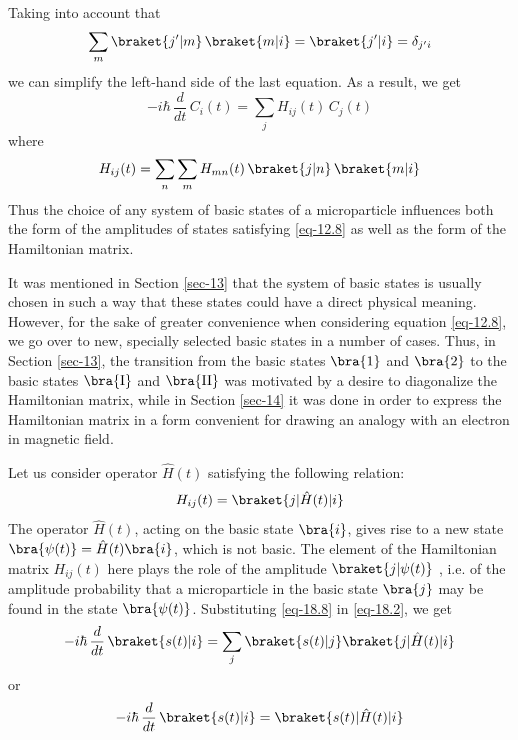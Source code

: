 \documentclass[a4paper,sfsidenotes,colorlinks=true]{tufte-book}
\numberwithin{equation}{section}
\numberwithin{figure}{section}
\begin{document}
Taking into account that 
\begin{equation*}%
\sum_{m} \braket{j'|m} \, \braket{m|i} = \braket{j'|i} = \delta_{j' i} 
\end{equation*}
we can simplify the left-hand side of the last equation. As a result, we get 
\begin{equation*}%
- i \hbar \, \frac{d}{dt} \, C_{i}(t)  = \sum_{j}  H_{ij} (t) \, C_{j}(t)
\end{equation*}
where
\begin{equation}%
H_{ij}(t) = \sum_{n} \sum_{m} H_{mn} (t) \, \braket{j|n} \, \braket{m|i}
\label{eq-18.7}
\end{equation}
Thus the choice of any system of basic states of a microparticle
influences both the form of the amplitudes of states satisfying \ref{eq-12.8}
as well as the form of the Hamiltonian matrix.

It was mentioned in Section \ref{sec-13} that the system of basic
states is usually chosen in such a way that these states could have a
direct physical meaning. However, for the sake of greater convenience
when considering equation \ref{eq-12.8}, we go over to new, specially
selected basic states in a number of cases. Thus, in Section
\ref{sec-13}, the transition from the basic states $\bra{1}$ and
$\bra{2}$ to the basic states $\bra{\mathrm{I}}$ and $\bra{\mathrm{II}}$ was motivated
by a desire to diagonalize the Hamiltonian matrix, while in Section
\ref{sec-14} it was done in order to express the Hamiltonian matrix in
a form convenient for drawing an analogy with an electron in magnetic
field.

Let us consider
operator $\hat{H} (t)$ satisfying the following relation:
\begin{equation}
H_{ij} (t)=  \braket{j | \hat{H} (t)| i}
\label{eq-18.8}
\end{equation}
The operator $\hat{H} (t)$, acting on the basic state $\bra{i}$, gives
rise to a new state $\bra{\psi (t)} = \hat{H} (t) \bra{i}$, which is
not basic. The element of the Hamiltonian matrix $H_{ij} (t)$ here plays
the role of the amplitude $\braket{j|\psi (t)}$ , i.e. of the amplitude
probability that a microparticle in the basic state $\bra{j}$ may be found
in the state $\bra{\psi (t)}$. Substituting \ref{eq-18.8} in \ref{eq-18.2}, we get
\begin{equation}
- i \hbar \, \frac{d}{dt} \, \braket{s(t)| i} = \sum_{j}
\braket{s(t)| j} \braket{j| \hat{H} (t)|i}
\label{eq-18.9}
\end{equation}
or
\begin{equation}
- i \hbar \, \frac{d}{dt} \, \braket{s(t)| i} = \braket{s(t)| \hat{H} (t)|i}
\label{eq-18.10}
\end{equation}
\end{document}
